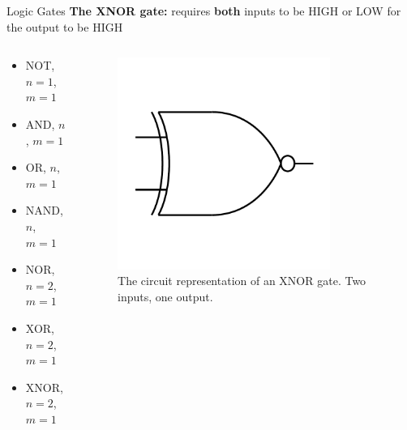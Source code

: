 \documentclass{beamer}
\begin{document}
\begin{frame}{Logic Gates}
\textbf{The XNOR gate:} requires \textbf{both} inputs to be HIGH or LOW for the output to be HIGH \\ \vspace{0.5cm}
\begin{columns}[T]
\begin{column}{0.5\textwidth}
\begin{itemize}
\item \alert{NOT, $n=1$, $m=1$}
\item \alert{AND, $n$, $m=1$}
\item \alert{OR, $n$, $m=1$}
\item \alert{NAND, $n$, $m=1$}
\item \alert{NOR, $n=2$, $m=1$}
\item \alert{XOR, $n=2$, $m=1$}
\item \alert{XNOR, $n=2$, $m=1$}
\end{itemize}
\end{column}
\begin{column}{0.5\textwidth}
\begin{figure}
\centering
\includegraphics[width=0.8\textwidth,trim=0cm 2cm 0cm 2cm,clip=true]{figures/BasicXNOR.pdf}
\caption{\label{fig:xnor} The circuit representation of an XNOR gate.  Two inputs, one output.}
\end{figure}
\end{column}
\end{columns}
\end{frame}
\end{document}
